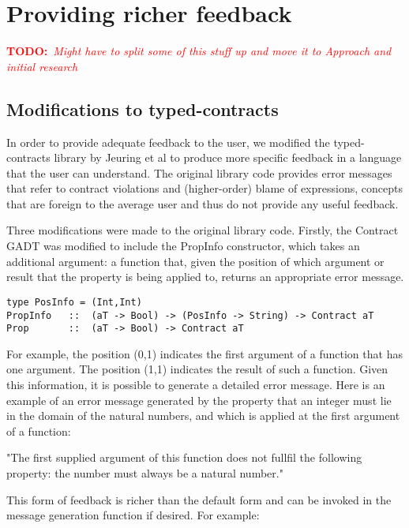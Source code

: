 \documentclass[10pt]{report}
\newcommand{\annotate}[3]{
	\begin{scriptsize}
	\textcolor{#1}{\textbf{#2}~\textit{#3}}
	\end{scriptsize}\newline}
\newcommand{\todo}[1]{\annotate{red} {TODO:} {#1}}
\begin{document}
\section{Providing richer feedback}
\label{providingricherfeedback}
\todo{Might have to split some of this stuff up and move it to Approach and initial research}

\subsection{Modifications to typed-contracts}
\label{modificationstotypedcontracts}
In order to provide adequate feedback to the user, we modified the typed-contracts library by Jeuring et al to produce more specific feedback in a language that the user can understand.
The original library code provides error messages that refer to contract violations and (higher-order) blame of expressions, concepts that are foreign to the average user and thus do not provide any useful feedback.

Three modifications were made to the original library code.
Firstly, the Contract GADT was modified to include the PropInfo constructor, which takes an additional argument: a function that, given the position of which argument or result that the property is being applied to, returns an appropriate error message.

\begin{lstlisting}
type PosInfo = (Int,Int)
PropInfo   ::  (aT -> Bool) -> (PosInfo -> String) -> Contract aT
Prop       ::  (aT -> Bool) -> Contract aT
\end{lstlisting}

For example, the position (0,1) indicates the first argument of a function that has one argument.
The position (1,1) indicates the result of such a function.
Given this information, it is possible to generate a detailed error message.
Here is an example of an error message generated by the property that an integer must lie in the domain of the natural numbers, and which is applied at the first argument of a function: 

"The first supplied argument of this function does not fullfil the following property: the number must always be a natural number."

This form of feedback is richer than the default form and can be invoked in the message generation function if desired.
For example:
\end{document}
